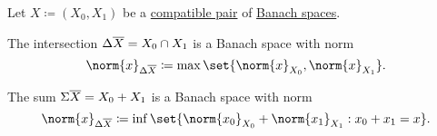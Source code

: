 \begin{proposition}\label{def:banach_space_sum_and_intersection_norms}
  Let \( X \coloneqq (X_0, X_1) \) be a \hyperref[def:interpolated_topological_vector_space/compatibility]{compatible pair} of \hyperref[def:banach_space]{Banach spaces}.

  \begin{thmenum}
     The intersection \( \Delta \oline{X} = X_0 \cap X_1 \) is a Banach space with norm
    \begin{equation}\label{eq:def:banach_space_sum_and_intersection_norms/intersection}
      \norm{x}_{\Delta \oline{X}} \coloneqq \max \set{ \norm{x}_{X_0}, \norm{x}_{X_1} }.
    \end{equation}

     The sum \( \Sigma \oline{X} = X_0 + X_1 \) is a Banach space with norm
    \begin{equation}\label{eq:def:banach_space_sum_and_intersection_norms/sum}
      \norm{x}_{\Delta \oline{X}} \coloneqq \inf \set{ \norm{x_0}_{X_0} + \norm{x_1}_{X_1} : x_0 + x_1 = x }.
    \end{equation}
  \end{thmenum}
\end{proposition}
